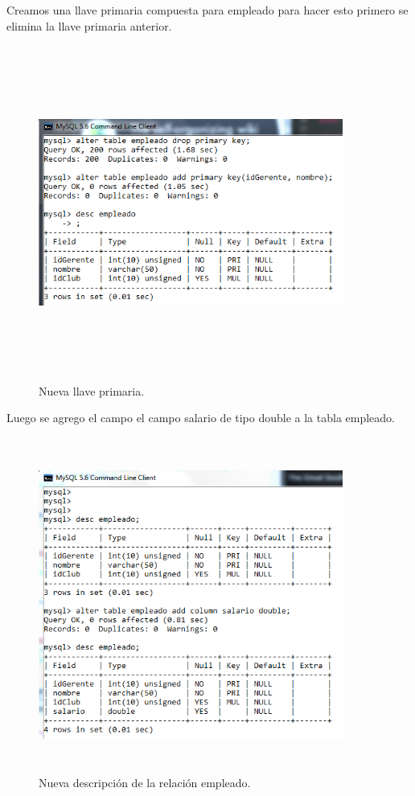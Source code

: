 \documentclass[12pt, titlepage]{article}
\begin{document}
Creamos una llave primaria compuesta para empleado para hacer esto primero se elimina la llave primaria anterior.
\begin{figure}[H]
    \begin{center}
        \includegraphics[width=10cm, height=11cm]{img/llave.png}
        \caption{Nueva llave primaria.}
        \label{fig:arlter13}
    \end{center}
\end{figure}
Luego se agrego el campo el campo salario de tipo double a la tabla empleado.
\begin{figure}[H]
    \begin{center}
        \includegraphics[width=10cm, height=11cm]{img/salario.png}
        \caption{Nueva descripción de la relación empleado.}
        \label{fig:arlter14}
    \end{center}
\end{figure}
\end{document}

